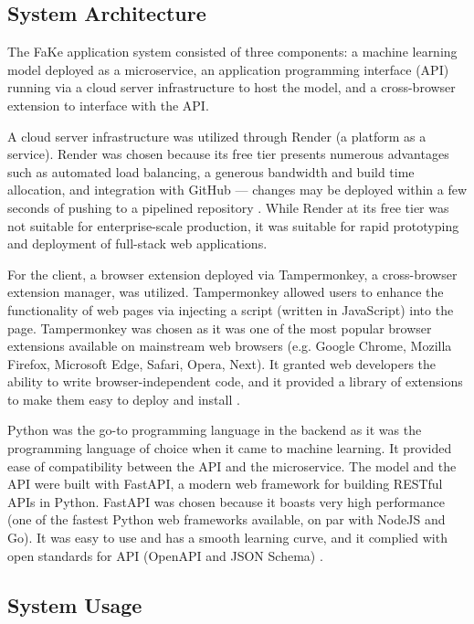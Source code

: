 \subsection{System Architecture}

The FaKe application system consisted of three components: a machine learning model deployed as a microservice, an application programming interface (API) running via a cloud server infrastructure to host the model, and a cross-browser extension to interface with the API.

A cloud server infrastructure was utilized through Render (a platform as a service). Render was chosen because its free tier presents numerous advantages such as automated load balancing, a generous bandwidth and build time allocation, and integration with GitHub — changes may be deployed within a few seconds of pushing to a pipelined repository \cite{render-docs}. While Render at its free tier was not suitable for enterprise-scale production, it was suitable for rapid prototyping and deployment of full-stack web applications.

For the client, a browser extension deployed via Tampermonkey, a cross-browser extension manager, was utilized. Tampermonkey allowed users to enhance the functionality of web pages via injecting a script (written in JavaScript) into the page. Tampermonkey was chosen as it was one of the most popular browser extensions available on mainstream web browsers (e.g. Google Chrome, Mozilla Firefox, Microsoft Edge, Safari, Opera, Next). It granted web developers the ability to write browser-independent code, and it provided a library of extensions to make them easy to deploy and install \cite{tampermonkey-website}.

Python was the go-to programming language in the backend as it was the programming language of choice when it came to machine learning. It provided ease of compatibility between the API and the microservice. The model and the API were built with FastAPI, a modern web framework for building RESTful APIs in Python. FastAPI was chosen because it boasts very high performance (one of the fastest Python web frameworks available, on par with NodeJS and Go). It was easy to use and has a smooth learning curve, and it complied with open standards for API (OpenAPI and JSON Schema) \cite{fastapi-website}.

\subsection{System Usage}

